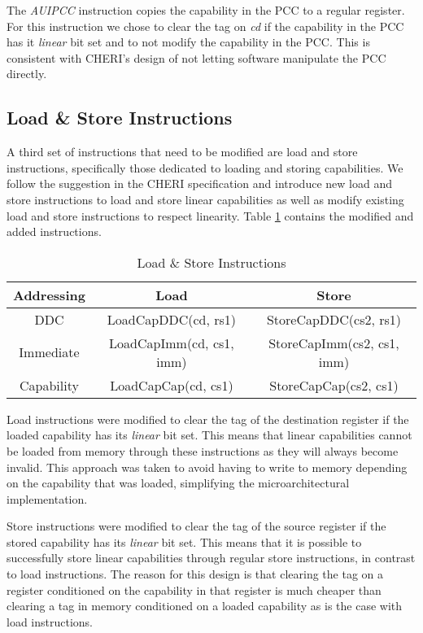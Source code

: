 The \textit{AUIPCC} instruction copies the capability in the PCC to a regular register. For this instruction we chose to clear the tag on \textit{cd} if the capability in the PCC has it \textit{linear} bit set and to not modify the capability in the PCC. This is consistent with CHERI's design of not letting software manipulate the PCC directly.

\subsection{Load \& Store Instructions}
A third set of instructions that need to be modified are load and store instructions, specifically those dedicated to loading and storing capabilities. We follow the suggestion in the CHERI specification and introduce new load and store instructions to load and store linear capabilities as well as modify existing load and store instructions to respect linearity. Table \ref{table:loadstoreinst} contains the modified and added instructions.

\begin{table}[h]
\centering
\begin{tabular}{| c | c | c |}
\hline
 Addressing & Load & Store \\
 \hline
 DDC & LoadCapDDC(cd, rs1) & StoreCapDDC(cs2, rs1) \\
 Immediate & LoadCapImm(cd, cs1, imm) & StoreCapImm(cs2, cs1, imm) \\
 Capability & LoadCapCap(cd, cs1) & StoreCapCap(cs2, cs1) \\
\hline
\end{tabular}
\caption{Load \& Store Instructions}
\label{table:loadstoreinst}
\end{table}

Load instructions were modified to clear the tag of the destination register if the loaded capability has its \textit{linear} bit set. This means that linear capabilities cannot be loaded from memory through these instructions as they will always become invalid. This approach was taken to avoid having to write to memory depending on the capability that was loaded, simplifying the microarchitectural implementation.

Store instructions were modified to clear the tag of the source register if the stored capability has its \textit{linear} bit set. This means that it is possible to successfully store linear capabilities through regular store instructions, in contrast to load instructions. The reason for this design is that clearing the tag on a register conditioned on the capability in that register is much cheaper than clearing a tag in memory conditioned on a loaded capability as is the case with load instructions.

